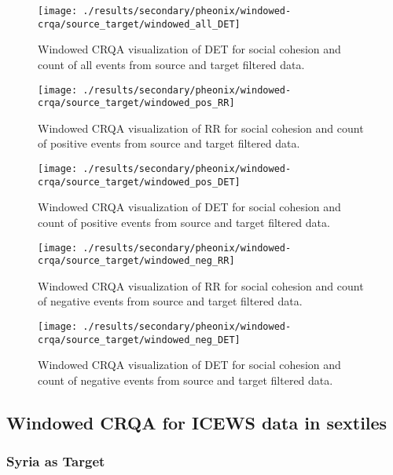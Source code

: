 \documentclass[english,man]{apa6}
\begin{document}
\begin{figure}
\texttt{[image: ./results/secondary/pheonix/windowed-crqa/source\_target/windowed\_all\_DET]} \caption{Windowed CRQA visualization of DET for social cohesion and count of all events from source and target filtered data.}\label{fig:plot-DET-source-targ-all-secondary-pheonix}
\end{figure}

\begin{figure}
\texttt{[image: ./results/secondary/pheonix/windowed-crqa/source\_target/windowed\_pos\_RR]} \caption{Windowed CRQA visualization of RR for social cohesion and count of positive events from source and target filtered data.}\label{fig:plot-RR-source-targ-pos-secondary-pheonix}
\end{figure}

\begin{figure}
\texttt{[image: ./results/secondary/pheonix/windowed-crqa/source\_target/windowed\_pos\_DET]} \caption{Windowed CRQA visualization of DET for social cohesion and count of positive events from source and target filtered data.}\label{fig:plot-DET-source-targ-pos-secondary-pheonix}
\end{figure}

\begin{figure}
\texttt{[image: ./results/secondary/pheonix/windowed-crqa/source\_target/windowed\_neg\_RR]} \caption{Windowed CRQA visualization of RR for social cohesion and count of negative events from source and target filtered data.}\label{fig:plot-RR-source-targ-neg-secondary-pheonix}
\end{figure}

\begin{figure}
\texttt{[image: ./results/secondary/pheonix/windowed-crqa/source\_target/windowed\_neg\_DET]} \caption{Windowed CRQA visualization of DET for social cohesion and count of negative events from source and target filtered data.}\label{fig:plot-DET-source-targ-neg-secondary-pheonix}
\end{figure}

\hypertarget{windowed-crqa-for-icews-data-in-sextiles}{%
\subsection{Windowed CRQA for ICEWS data in sextiles}\label{windowed-crqa-for-icews-data-in-sextiles}}

\hypertarget{syria-as-target-5}{%
\subsubsection{Syria as Target}\label{syria-as-target-5}}
\end{document}

